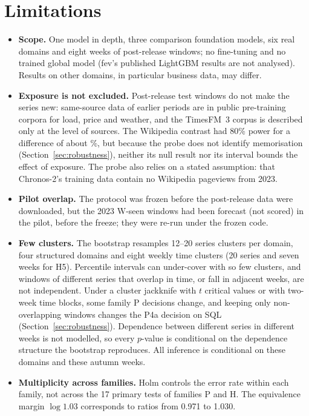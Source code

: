 \section{Limitations}
\label{sec:limitations}

\begin{itemize}
\item \textbf{Scope.} One model in depth, three comparison foundation models, six real domains and eight weeks of post-release
windows; no fine-tuning and no trained global model (fev's published LightGBM results are not analysed). Results on other domains,
in particular business data, may differ.
\item \textbf{Exposure is not excluded.} Post-release test windows do not make the series new: same-source data of earlier
periods are in public pre-training corpora for load, price and weather, and the TimesFM~3 corpus is described only at the level of
sources. The Wikipedia contrast had 80\% power for a difference of about \HtwoMde\%, but because the probe does not identify
memorisation (Section~\ref{sec:robustness}), neither its null result nor its interval bounds the effect of exposure. The probe also relies on a stated assumption: that Chronos-2's training data contain no
Wikipedia pageviews from 2023.
\item \textbf{Pilot overlap.} The protocol was frozen before the post-release data were downloaded, but the 2023 W-seen windows
had been forecast (not scored) in the pilot, before the freeze; they were re-run under the frozen code.
\item \textbf{Few clusters.} The bootstrap resamples 12--20 series clusters per domain, four structured domains and eight weekly time
clusters (20 series and seven weeks for H5). Percentile intervals can under-cover with so few clusters, and windows of different series
that overlap in time, or fall in adjacent weeks, are not independent. Under a cluster jackknife with $t$ critical values or with
two-week time blocks, some family P decisions change, and keeping only non-overlapping windows changes the P4a decision on SQL
(Section~\ref{sec:robustness}). Dependence between different series in different weeks is not modelled, so every $p$-value is
conditional on the dependence structure the bootstrap reproduces. All inference is conditional on these domains and these autumn
weeks.
\item \textbf{Multiplicity across families.} Holm controls the error rate within each family, not across the 17 primary tests of
families P and H. The equivalence margin $\log 1.03$ corresponds to ratios from 0.971 to 1.030.

\end{itemize}
